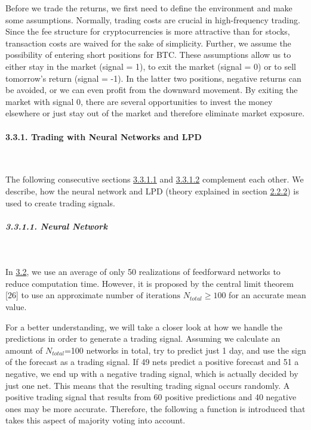 \documentclass[
]{article}
\begin{document}
Before we trade the returns, we first need to define the environment and
make some assumptions. Normally, trading costs are crucial in
high-frequency trading. Since the fee structure for cryptocurrencies is
more attractive than for stocks, transaction costs are waived for the
sake of simplicity. Further, we assume the possibility of entering short
positions for BTC. These assumptions allow us to either stay in the
market (signal = 1), to exit the market (signal = 0) or to sell
tomorrow's return (signal = -1). In the latter two positions, negative
returns can be avoided, or we can even profit from the downward
movement. By exiting the market with signal 0, there are several
opportunities to invest the money elsewhere or just stay out of the
market and therefore eliminate market exposure.

\newpage

\hypertarget{trading_lpd_nn}{%
\paragraph{3.3.1. Trading with Neural Networks and
LPD}\label{trading_lpd_nn}}

~

The following consecutive sections \protect\hyperlink{network}{3.3.1.1}
and \protect\hyperlink{lpd-signal}{3.3.1.2} complement each other. We
describe, how the neural network and LPD (theory explained in section
\protect\hyperlink{xai_finance}{2.2.2}) is used to create trading
signals.

\hypertarget{network}{%
\subparagraph{3.3.1.1. Neural Network}\label{network}}

~

In \protect\hyperlink{networkarchitecture}{3.2}, we use an average of
only 50 realizations of feedforward networks to reduce computation time.
However, it is proposed by the central limit theorem {[}26{]} to use an
approximate \(\text{number of iterations } N_{total} \ge 100\) for an
accurate mean value.

For a better understanding, we will take a closer look at how we handle
the predictions in order to generate a trading signal. Assuming we
calculate an amount of \(N_{total}\)=100 networks in total, try to
predict just 1 day, and use the sign of the forecast as a trading
signal. If 49 nets predict a positive forecast and 51 a negative, we end
up with a negative trading signal, which is actually decided by just one
net. This means that the resulting trading signal occurs randomly. A
positive trading signal that results from 60 positive predictions and 40
negative ones may be more accurate. Therefore, the following a function
is introduced that takes this aspect of majority voting into account.
\end{document}
